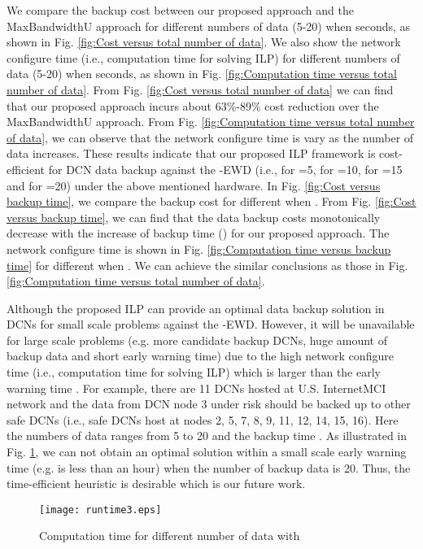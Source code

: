 \documentclass[conference]{IEEEtran}\IEEEoverridecommandlockouts
\begin{document}
We compare the backup cost between our proposed approach and the MaxBandwidthU approach for different numbers of data  (5-20) when   seconds,  as shown in Fig. \ref{fig:Cost versus total number of data}.  We also show the network configure time  (i.e., computation time for solving ILP) for different numbers of data  (5-20) when   seconds,  as shown in Fig. \ref{fig:Computation time versus total number of data}.
From Fig. \ref{fig:Cost versus total number of data} we can find that our proposed approach incurs about 63\%-89\% cost reduction over the  MaxBandwidthU approach. From Fig. \ref{fig:Computation time versus total number of data}, we can observe that the network configure time is vary as the number of data increases. These results indicate that our proposed ILP framework is cost-efficient for DCN data backup against the  -EWD (i.e.,  for =5,   for =10,   for =15 and  for =20) under the above mentioned hardware. In Fig. \ref{fig:Cost versus backup time}, we compare the backup cost for different  when . From Fig. \ref{fig:Cost versus backup time},  we can find that the data backup costs monotonically decrease with the increase of  backup time () for our proposed approach. The network configure time is shown in Fig. \ref{fig:Computation time versus backup time} for different  when . We can achieve the similar conclusions as those in Fig. \ref{fig:Computation time versus total number of data}.

Although the proposed ILP can provide an optimal data backup solution in DCNs for small scale problems against the -EWD. However, it will be unavailable for large scale problems (e.g. more candidate backup DCNs, huge amount of backup data and short early warning time) due to the high network configure time (i.e., computation time for solving ILP) which is larger than the early warning time . For example, there are 11 DCNs hosted at  U.S. InternetMCI network and the data from DCN node 3 under risk should be backed up to other safe DCNs (i.e., safe DCNs host at nodes 2, 5, 7, 8, 9, 11, 12, 14, 15, 16). Here the numbers of data  ranges from 5 to 20 and the backup time .  As illustrated in Fig. \ref{fig1:Computation time versus total number of data }, we can not obtain an optimal solution within a small scale early warning time (e.g.  is less than an hour) when the number of backup data is 20.  Thus, the time-efficient heuristic is desirable which is our future work.
\begin{figure}[t]
      \centering
      \texttt{[image: runtime3.eps]}
   \caption{Computation time for different number of data  with }
   \label{fig1:Computation time versus total number of data }
  \end{figure}
\end{document}
